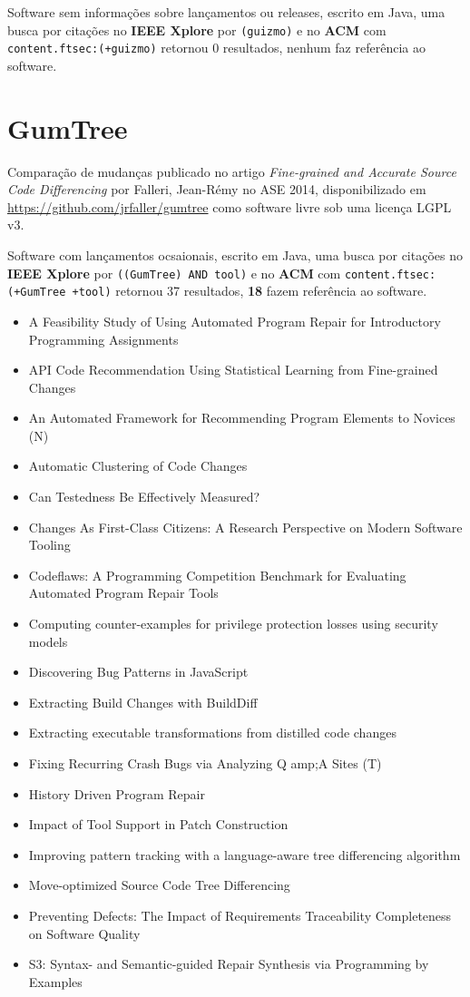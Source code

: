 Software sem informações sobre lançamentos ou releases,
escrito em Java,
uma busca por citações no {\bf IEEE Xplore} por
\texttt{(guizmo)}
e no {\bf ACM} com
\texttt{content.ftsec:(+guizmo)}
retornou
0 resultados,
nenhum faz referência ao software.



\section{GumTree}

Comparação de mudanças
publicado no artigo {\it Fine-grained and Accurate Source Code Differencing}
por Falleri, Jean-R{\'e}my
no ASE 2014,
disponibilizado em \url{https://github.com/jrfaller/gumtree}
como software livre
sob uma licença LGPL v3.

Software com lançamentos ocsaionais,
escrito em Java,
uma busca por citações no {\bf IEEE Xplore} por
\texttt{((GumTree) AND tool)}
e no {\bf ACM} com
\texttt{content.ftsec:(+GumTree +tool)}
retornou
37 resultados,
{\bf 18} fazem referência ao software.

\begin{itemize}
\item A Feasibility Study of Using Automated Program Repair for Introductory Programming Assignments
\item API Code Recommendation Using Statistical Learning from Fine-grained Changes
\item An Automated Framework for Recommending Program Elements to Novices (N)
\item Automatic Clustering of Code Changes
\item Can Testedness Be Effectively Measured?
\item Changes As First-Class Citizens: A Research Perspective on Modern Software Tooling
\item Codeflaws: A Programming Competition Benchmark for Evaluating Automated Program Repair Tools
\item Computing counter-examples for privilege protection losses using security models
\item Discovering Bug Patterns in JavaScript
\item Extracting Build Changes with BuildDiff
\item Extracting executable transformations from distilled code changes
\item Fixing Recurring Crash Bugs via Analyzing Q amp;A Sites (T)
\item History Driven Program Repair
\item Impact of Tool Support in Patch Construction
\item Improving pattern tracking with a language-aware tree differencing algorithm
\item Move-optimized Source Code Tree Differencing
\item Preventing Defects: The Impact of Requirements Traceability Completeness on Software Quality
\item S3: Syntax- and Semantic-guided Repair Synthesis via Programming by Examples
\end{itemize}

